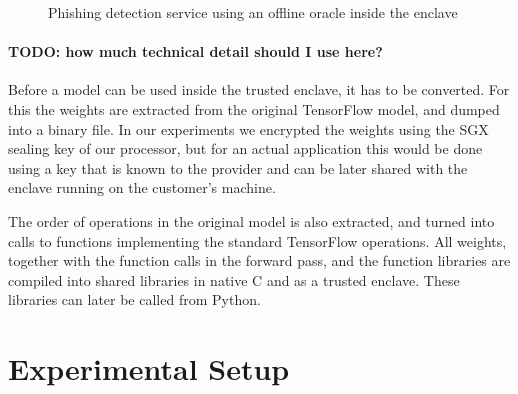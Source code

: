 \documentclass[11pt,twocolumn]{article}
\newcommand{\mail}{E-mail}
\newcommand{\tf}{TensorFlow}
\begin{document}
\begin{figure}[h]
    \centering
    \caption{Phishing detection service using an offline oracle inside the enclave}
    \label{fig:offline-phishing}
\end{figure}

\paragraph{TODO: how much technical detail should I use here?}
Before a model can be used inside the trusted enclave, it has to be converted.
For this the weights are extracted from the original \tf{} model, and dumped into a binary file.
In our experiments we encrypted the weights using the SGX sealing key of our processor, but for an actual application this would be done using a key that is known to the provider and can be later shared with the enclave running on the customer's machine.

The order of operations in the original model is also extracted, and turned into calls to functions implementing the standard \tf{} operations.
All weights, together with the function calls in the forward pass, and the function libraries are compiled into shared libraries in native C and as a trusted enclave.
These libraries can later be called from Python.

\section{Experimental Setup}
\label{sec:setup}
\end{document}
